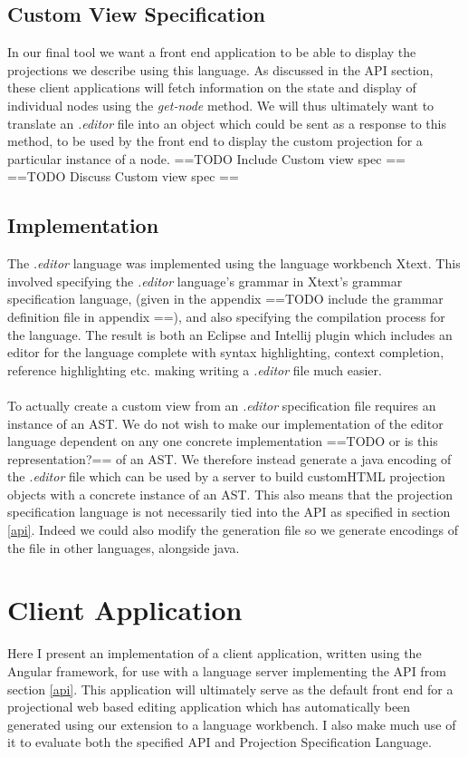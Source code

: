 \documentclass{report}
\begin{document}
\subsection{Custom View Specification}
In our final tool we want a front end application to be able to display the projections we describe using this language. As discussed in the API section, these client applications will fetch information on the state and display of individual nodes using the \emph{get-node} method. We will thus ultimately want to translate an \emph{.editor} file into an object which could be sent as a response to this method, to be used by the front end to display the custom projection for a particular instance of a node.
==TODO Include Custom view spec ==
==TODO Discuss Custom view spec == 


\subsection{Implementation}
The \emph{.editor} language was implemented using the language workbench Xtext. This involved specifying the \emph{.editor} language's grammar in Xtext's grammar specification language, (given in the appendix ==TODO include the grammar definition file in appendix ==), and also specifying the compilation process for the language. The result is both an Eclipse and Intellij plugin which includes an editor for the language complete with syntax highlighting, context completion, reference highlighting etc. making writing a \emph{.editor} file much easier.
\\
\\
To actually create a custom view from an \emph{.editor} specification file requires an instance of an AST. We do not wish to make our implementation of the editor language dependent on any one concrete implementation ==TODO or is this representation?== of an AST. We therefore instead generate a java encoding of the \emph{.editor} file which can be used by a server to build customHTML projection objects with a concrete instance of an AST. This also means that the projection specification language is not necessarily tied into the API as specified in section \ref{api}. Indeed we could also modify the generation file so we generate encodings of the file in other languages, alongside java.

\section{Client Application}
Here I present an implementation of a client application, written using the Angular framework, for use with a language server implementing the API from section \ref{api}. This application will ultimately serve as the default front end for a projectional web based editing application which has automatically been generated using our extension to a language workbench. I also make much use of it to evaluate both the specified API and Projection Specification Language. 
\end{document}
